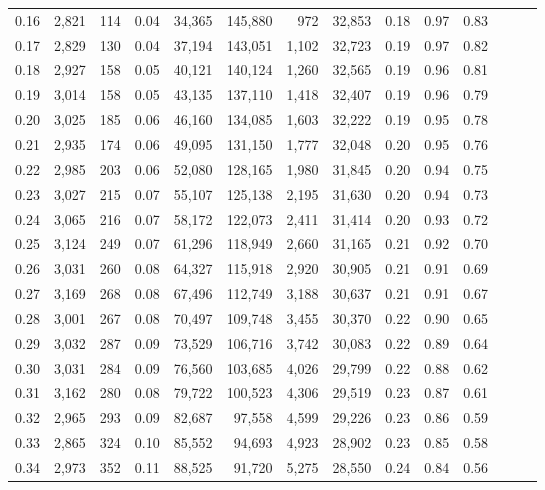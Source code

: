 \begin{tabular}{rrrrrrrrrrrrrr}
0.16 &  2,821 &  114 &  0.04 &   34,365 &  145,880 &     972 &  32,853 &  0.18 &  0.97 &      0.83 \\
0.17 &  2,829 &  130 &  0.04 &   37,194 &  143,051 &   1,102 &  32,723 &  0.19 &  0.97 &      0.82 \\
0.18 &  2,927 &  158 &  0.05 &   40,121 &  140,124 &   1,260 &  32,565 &  0.19 &  0.96 &      0.81 \\
0.19 &  3,014 &  158 &  0.05 &   43,135 &  137,110 &   1,418 &  32,407 &  0.19 &  0.96 &      0.79 \\
0.20 &  3,025 &  185 &  0.06 &   46,160 &  134,085 &   1,603 &  32,222 &  0.19 &  0.95 &      0.78 \\
0.21 &  2,935 &  174 &  0.06 &   49,095 &  131,150 &   1,777 &  32,048 &  0.20 &  0.95 &      0.76 \\
0.22 &  2,985 &  203 &  0.06 &   52,080 &  128,165 &   1,980 &  31,845 &  0.20 &  0.94 &      0.75 \\
0.23 &  3,027 &  215 &  0.07 &   55,107 &  125,138 &   2,195 &  31,630 &  0.20 &  0.94 &      0.73 \\
0.24 &  3,065 &  216 &  0.07 &   58,172 &  122,073 &   2,411 &  31,414 &  0.20 &  0.93 &      0.72 \\
0.25 &  3,124 &  249 &  0.07 &   61,296 &  118,949 &   2,660 &  31,165 &  0.21 &  0.92 &      0.70 \\
0.26 &  3,031 &  260 &  0.08 &   64,327 &  115,918 &   2,920 &  30,905 &  0.21 &  0.91 &      0.69 \\
0.27 &  3,169 &  268 &  0.08 &   67,496 &  112,749 &   3,188 &  30,637 &  0.21 &  0.91 &      0.67 \\
0.28 &  3,001 &  267 &  0.08 &   70,497 &  109,748 &   3,455 &  30,370 &  0.22 &  0.90 &      0.65 \\
0.29 &  3,032 &  287 &  0.09 &   73,529 &  106,716 &   3,742 &  30,083 &  0.22 &  0.89 &      0.64 \\
0.30 &  3,031 &  284 &  0.09 &   76,560 &  103,685 &   4,026 &  29,799 &  0.22 &  0.88 &      0.62 \\
0.31 &  3,162 &  280 &  0.08 &   79,722 &  100,523 &   4,306 &  29,519 &  0.23 &  0.87 &      0.61 \\
0.32 &  2,965 &  293 &  0.09 &   82,687 &   97,558 &   4,599 &  29,226 &  0.23 &  0.86 &      0.59 \\
0.33 &  2,865 &  324 &  0.10 &   85,552 &   94,693 &   4,923 &  28,902 &  0.23 &  0.85 &      0.58 \\
0.34 &  2,973 &  352 &  0.11 &   88,525 &   91,720 &   5,275 &  28,550 &  0.24 &  0.84 &      0.56 \\

\end{tabular}
